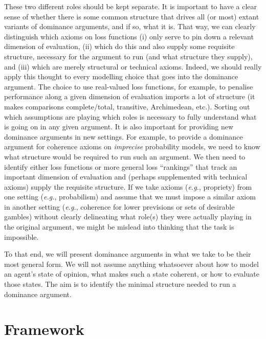 \documentclass[11pt]{article}
\theoremstyle{definition}
\theoremstyle{remark}
\begin{document}
These two different roles should be kept separate. It is important to have a clear sense of whether there is some common structure that drives all (or most) extant variants of dominance arguments, and if so, what it is. That way, we can clearly distinguish which axioms on loss functions (i) only serve to pin down a relevant dimension of evaluation, (ii) which do this and also supply some requisite structure, necessary for the argument to run (and what structure they supply), and (iii) which are merely structural or technical axioms. Indeed, we should really apply this thought to every modelling choice that goes into the dominance argument. The choice to use real-valued loss functions, for example, to penalise performance along a given dimension of evaluation imports a lot of structure (it makes comparisons complete/total, transitive, Archimedean, etc.). Sorting out which assumptions are playing which roles is necessary to fully understand what is going on in any given argument. It is also important for providing new dominance arguments in new settings. For example, to provide a dominance argument for coherence axioms on \textit{imprecise} probability models, we need to know what structure would be required to run such an argument. We then need to identify either loss functions or more general loss ``rankings'' that track an important dimension of evaluation and (perhaps supplemented with technical axioms) supply the requisite structure. If we take axioms (\textit{e.g.}, propriety) from one setting (\textit{e.g.}, probabilism) and assume that we must impose a similar axiom in another setting (\textit{e.g.}, coherence for lower previsions or sets of desirable gambles) without clearly delineating what role(s) they were actually playing in the original argument, we might be mislead into thinking that the task is impossible.


To that end, we will present dominance arguments in what we take to be their most general form. We will not assume anything whatsoever about how to model an agent's state of opinion, what makes such a state coherent, or how to evaluate those states. The aim is to identify the minimal structure needed to run a dominance argument.



\section{Framework}\label{sec:framework}
\end{document}
